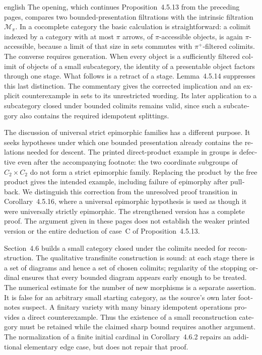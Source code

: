\begin{otherlanguage}{english}
\begin{otherlanguage*}{english}
The opening, which continues Proposition~4.5.13 from the preceding pages, compares two bounded-presentation filtrations with the intrinsic filtration $\mathcal M_\pi$. In a cocomplete category the basic calculation is straightforward: a colimit indexed by a category with at most $\pi$ arrows, of $\pi$-accessible objects, is again $\pi$-accessible, because a limit of that size in sets commutes with $\pi^+$-filtered colimits. The converse requires generation. When every object is a sufficiently filtered colimit of objects of a small subcategory, the identity of a presentable object factors through one stage. What follows is a retract of a stage. Lemma~4.5.14 suppresses this last distinction. The commentary gives the corrected implication and an explicit counterexample in sets to its unrestricted wording. Its later application to a subcategory closed under bounded colimits remains valid, since such a subcategory also contains the required idempotent splittings.

The discussion of universal strict epimorphic families has a different purpose. It seeks hypotheses under which one bounded presentation already contains the relations needed for descent. The printed direct-product example in groups is defective even after the accompanying footnote: the two coordinate subgroups of $C_2\times C_2$ do not form a strict epimorphic family. Replacing the product by the free product gives the intended example, including failure of epimorphy after pullback. We distinguish this correction from the unresolved proof transition in Corollary~4.5.16, where a universal epimorphic hypothesis is used as though it were universally strictly epimorphic. The strengthened version has a complete proof. The argument given in these pages does not establish the weaker printed version or the entire deduction of case~C of Proposition~4.5.13.

Section~4.6 builds a small category closed under the colimits needed for reconstruction. The qualitative transfinite construction is sound: at each stage there is a set of diagrams and hence a set of chosen colimits; regularity of the stopping ordinal ensures that every bounded diagram appears early enough to be treated. The numerical estimate for the number of new morphisms is a separate assertion. It is false for an arbitrary small starting category, as the source's own later footnotes suspect. A finitary variety with many binary idempotent operations provides a direct counterexample. Thus the existence of a small reconstruction category must be retained while the claimed sharp bound requires another argument. The normalization of a finite initial cardinal in Corollary~4.6.2 repairs an additional elementary edge case, but does not repair that proof.


\end{otherlanguage*}
\end{otherlanguage}

